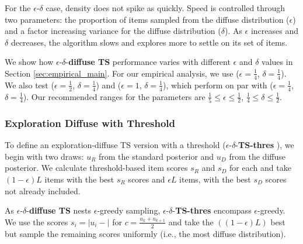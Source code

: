 \documentclass[nonblindrev]{informs3}
\newcommand{\edts}{$\epsilon$-$\delta$-\textbf{diffuse TS} }
\newcommand{\edtsthres}{$\epsilon$-$\delta$-\textbf{TS-thres} }
\newcommand{\numperset}{L}
\begin{document}
For the $\epsilon$-$\delta$ case, density does not spike as quickly. Speed is controlled through two parameters: the proportion of items sampled from the diffuse distribution ($\epsilon$) and a factor increasing variance for the diffuse distribution ($\delta$). As $\epsilon$ increases and $\delta$ decreases, the algorithm slows and explores more to settle on its set of items. 

We show how \edts performance varies with different $\epsilon$ and $\delta$ values in Section \ref{sec:empirical_main}.  For our empirical analysis, we use ($\epsilon=\frac{1}{4}$, $\delta=\frac{1}{4}$). We also test ($\epsilon=\frac{1}{2}$, $\delta=\frac{1}{4}$) and ($\epsilon=1$, $\delta=\frac{1}{4}$), which perform on par with ($\epsilon=\frac{1}{4}$, $\delta=\frac{1}{4}$). Our recommended ranges for the parameters are $\frac{1}{5}\leq \epsilon \leq \frac{1}{2}$, $\frac{1}{4}\leq \delta \leq \frac{1}{2}$.


\subsubsection{Exploration Diffuse with Threshold}

To define an exploration-diffuse TS version with a threshold (\edtsthres), we begin with two draws: $u_R$ from the standard posterior and $u_D$ from the diffuse posterior. We calculate threshold-based item scores $s_R$ and $s_D$ for each and take $(1- \epsilon) \numperset$ items with the best $s_R$ scores and $\epsilon \numperset$ items, with the best $s_D$ scores not already included. 

As \edts nests $\epsilon$-greedy sampling, \edtsthres encompass $\epsilon$-greedy. We use the scores $s_i=|u_i - |$ for $c=\frac{u_k+u_{k+1}}{2}$ and take the $((1-\epsilon)L)$ best but sample the remaining scores uniformly (i.e., the most diffuse distribution).
\end{document}
